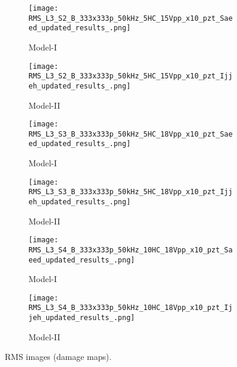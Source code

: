\begin{sloppypar}
	\begin{figure} [!ht]
		\begin{subfigure}[b]{.48\textwidth}
			\centering
			\texttt{[image: RMS\_L3\_S2\_B\_333x333p\_50kHz\_5HC\_15Vpp\_x10\_pzt\_Saeed\_updated\_results\_.png]}
			\caption{Model-I}
			\label{fig:RMS_L3_S4_B_saeed}
		\end{subfigure}
		\hfill
		\begin{subfigure}[b]{.48\textwidth}
			\centering
			\texttt{[image: RMS\_L3\_S2\_B\_333x333p\_50kHz\_5HC\_15Vpp\_x10\_pzt\_Ijjeh\_updated\_results\_.png]}
			\caption{Model-II} 
			\label{fig:RMS_L3_S2_B_ijjeh}
		\end{subfigure}
		\hfill
		\begin{subfigure}[b]{.48\textwidth}
			\centering
			\texttt{[image: RMS\_L3\_S3\_B\_333x333p\_50kHz\_5HC\_18Vpp\_x10\_pzt\_Saeed\_updated\_results\_.png]}
			\caption{Model-I}
			\label{fig:RMS_L3_S2_B_saeed}
		\end{subfigure}
		\hfill
		\begin{subfigure}[b]{.48\textwidth}
			\centering
			\texttt{[image: RMS\_L3\_S3\_B\_333x333p\_50kHz\_5HC\_18Vpp\_x10\_pzt\_Ijjeh\_updated\_results\_.png]}
			\caption{Model-II} 
			\label{fig:RMS_L3_S3_B_ijjeh}
		\end{subfigure}
		\hfill
		\begin{subfigure}[b]{.48\textwidth}
			\centering
			\texttt{[image: RMS\_L3\_S4\_B\_333x333p\_50kHz\_10HC\_18Vpp\_x10\_pzt\_Saeed\_updated\_results\_.png]}
			\caption{Model-I}
			\label{fig:RMS_L3_S3_B_saeed}
		\end{subfigure}
		\hfill
		\begin{subfigure}[b]{.48\textwidth}
			\centering
			\texttt{[image: RMS\_L3\_S4\_B\_333x333p\_50kHz\_10HC\_18Vpp\_x10\_pzt\_Ijjeh\_updated\_results\_.png]}
			\caption{Model-II} 
			\label{fig:RMS_L3_S4_B_ijjeh}
		\end{subfigure}
		\caption{RMS images (damage maps).}
		\label{fig:RMS_L3_S_B__images}
	\end{figure} 
	

\end{sloppypar}
